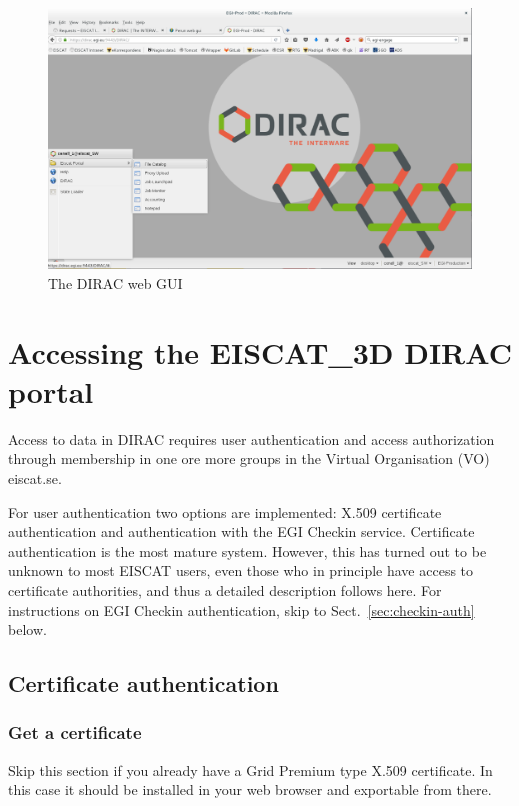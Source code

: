 \documentclass[a4paper]{article}
\newcommand{\etd}{EISCAT\_3D}
\begin{document}
\begin{figure}[htb]
  \centering
  \includegraphics[width=1.0\linewidth]{dirac-gui-desktop}
  \caption{The DIRAC web GUI}
  \label{fig:portal}
\end{figure}

\section{Accessing the \etd{} DIRAC portal}
\label{sec:access}

Access to data in DIRAC requires user authentication and access
authorization through membership in one ore more groups in the Virtual
Organisation (VO) eiscat.se.

For user authentication two options are implemented: X.509 certificate
authentication and authentication with the EGI Checkin service.
Certificate authentication is the most mature system. However, this has
turned out to be unknown to most EISCAT users, even those who in
principle have access to certificate authorities, and thus a detailed
description follows here. For instructions on EGI Checkin authentication,
skip to Sect.~\ref{sec:checkin-auth} below.


\subsection{Certificate authentication}
\label{sec:cert-auth}


\subsubsection{Get a certificate}
\label{sec:get-certificate}

Skip this section if you already have a Grid Premium type X.509 certificate. In this case it should be installed in your web browser and exportable from there.
\end{document}
